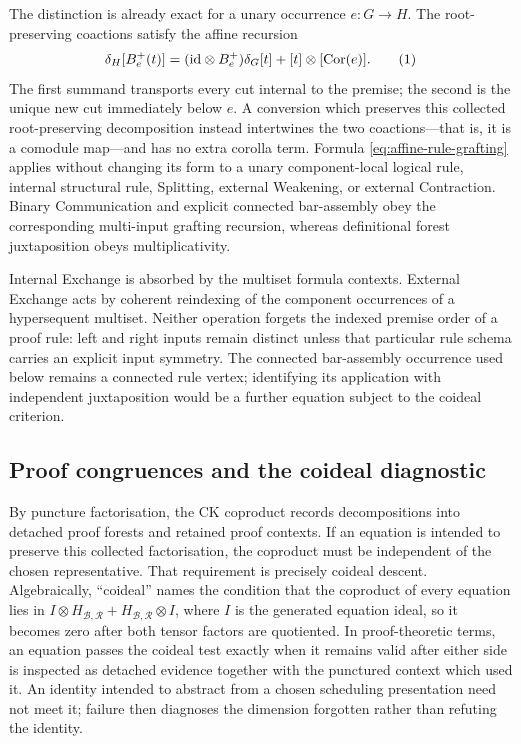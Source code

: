 \documentclass[10pt,a4paper]{article}
\theoremstyle{plain}
\theoremstyle{definition}
\theoremstyle{remark}
\newcommand{\Base}{\mathcal B}
\newcommand{\Rules}{\mathcal R}
\newcommand{\Hlic}{H_{\Base,\Rules}}
\newcommand{\eqtag}{\refstepcounter{equation}\tag{\theequation}}
\begin{document}
The distinction is already exact for a unary occurrence \(e:G\to H\).  The
root-preserving coactions satisfy the affine recursion
\[
 \delta_H[B_e^+(t)]
   =(\mathrm{id}\otimes B_e^+)\delta_G[t]
       +[t]\otimes[\operatorname{Cor}(e)].
\eqtag\label{eq:affine-rule-grafting}
\]
The first summand transports every cut internal to the premise; the second
is the unique new cut immediately below \(e\).  A conversion which
preserves this collected root-preserving decomposition instead intertwines
the two coactions---that is, it is a comodule map---and has no extra
corolla term.
Formula \eqref{eq:affine-rule-grafting} applies without changing its form to a
unary component-local logical rule, internal structural rule, Splitting, external
Weakening, or external Contraction.  Binary Communication and explicit
connected bar-assembly obey the corresponding multi-input grafting
recursion, whereas definitional forest juxtaposition obeys multiplicativity.

Internal Exchange is absorbed by the multiset formula contexts.  External
Exchange acts by coherent reindexing of the component occurrences of a
hypersequent multiset.  Neither operation forgets the indexed premise order
of a proof rule: left and right inputs remain distinct unless that
particular rule schema carries an explicit input symmetry.  The connected
bar-assembly occurrence used below remains a connected rule vertex;
identifying its application with independent juxtaposition would be a
further equation subject to the coideal criterion.

\subsection{Proof congruences and the coideal diagnostic}

By puncture factorisation, the CK coproduct records decompositions into
detached proof forests and retained proof contexts.  If an equation is
intended to preserve this collected factorisation, the coproduct must be
independent of the chosen representative.  That requirement is precisely
coideal descent.  Algebraically, ``coideal'' names the condition that the
coproduct of every equation lies in
\(I\otimes\Hlic+\Hlic\otimes I\), where \(I\) is the generated equation
ideal, so it becomes zero after both tensor
factors are quotiented.  In
proof-theoretic terms, an equation passes the
coideal test exactly when it remains valid after either side is inspected
as detached evidence together with the punctured context which used it.
An identity intended to abstract from a chosen scheduling presentation need not
meet it; failure then diagnoses the dimension forgotten rather than
refuting the identity.
\end{document}
